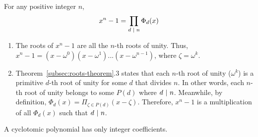 \begin{tcolorbox}[title={\textbf{\tboxtheorem{\ref*{subsec:cyclotomic-theorem}.2} Polynomial Decomposition into Cyclotomic Polynomials}}]
For any positive integer $n$, \[ x^n - 1 = \prod_{d \text{ } \text{$|$} \text{ } n} \Phi_d(x) \]
\end{tcolorbox}
\begin{myproof}
\begin{enumerate}
    \item The roots of $x^n - 1$ are all the $n$-th roots of unity. Thus, $x^n - 1 = (x - \omega^0)(x - \omega^1)...(x - \omega^{n-1})$, where $\zeta = \omega^k$.
    \item Theorem~\ref*{subsec:roots-theorem}.3 states that each $n$-th root of unity ($\omega^k$) is a primitive $d$-th root of unity for some $d$ that divides $n$. In other words, each $n$-th root of unity belongs to some $P(d)$ where $d \text{ } \text{$|$} \text{ } n$. Meanwhile, by definition, $\Phi_d(x) = \Pi_{\zeta \in P(d)} (x - \zeta)$. Therefore, $x^n - 1$ is a multiplication of all $\Phi_d(x)$ such that $d \text{ } \text{$|$} \text{ } n$. 
\end{enumerate}
\end{myproof}
\begin{tcolorbox}[title={\textbf{\tboxtheorem{\ref*{subsec:cyclotomic-theorem}.3} Integer Coefficients of Cyclotomic Polynomials}}]
A cyclotomic polynomial has only integer coefficients.
\end{tcolorbox}

